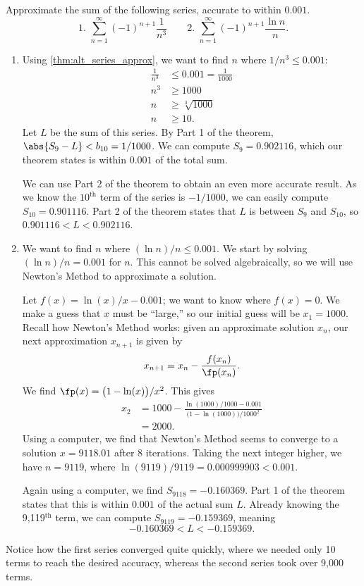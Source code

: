 \begin{example}\label{ex_alt_series_approx}%
Approximate the sum of the following series, accurate to within $0.001$.
\[
 \text{1. }\sum_{n=1}^\infty (-1)^{n+1}\frac{1}{n^3}\qquad
 \text{2. }\sum_{n=1}^\infty (-1)^{n+1}\frac{\ln n}{n}.
\]
\solution
\begin{enumerate}
	\item  Using \autoref{thm:alt_series_approx}, we want to find $n$ where $1/n^3 \le 0.001$:
	\begin{align*}
	\frac1{n^3} &\leq 0.001=\frac{1}{1000} \\
	n^3 &\geq 1000\\
	n &\geq \sqrt[3]{1000}\\
	n &\geq 10.
	\end{align*}
	Let $L$ be the sum of this series. By Part 1 of the theorem, $\abs{S_9-L}<b_{10} = 1/1000$. We can compute $S_9=0.902116$, which our theorem states is within $0.001$ of the total sum. 
	
	We can use Part 2 of the theorem to obtain an even more accurate result. As we know the $10^\text{th}$ term of the series is $-1/1000$, we can easily compute $S_{10} = 0.901116$. Part 2 of the theorem states that $L$ is between $S_9$ and $S_{10}$, so $0.901116 <L<0.902116$.
	
	\item		We want to find $n$ where $(\ln n)/n \le 0.001$. We start by solving $(\ln n)/n = 0.001$ for $n$. This cannot be solved algebraically, so we will use Newton's Method to approximate a solution. 
	
	Let $f(x) = \ln(x)/x-0.001$; we want to know where $f(x) = 0$. We make a guess that $x$ must be ``large,'' so our initial guess will be $x_1=1000$. Recall how Newton's Method works: given an approximate solution $x_n$, our next approximation $x_{n+1}$ is given by
	\[x_{n+1} = x_n - \frac{f(x_n)}{\fp(x_n)}.\]
	We find $\fp(x) = \bigl(1-\ln(x)\bigr)/x^2$. This gives
	\begin{align*}
	x_2 &= 1000 - \frac{\ln(1000)/1000-0.001}{\bigl(1-\ln(1000)\bigr)/1000^2} \\
			&= 2000.
	\end{align*}
	Using a computer, we find that Newton's Method seems to converge to a solution $x=9118.01$ after 8 iterations. Taking the next integer higher, we have $n=9119$, where $\ln(9119)/9119 =0.000999903<0.001$.
	
	Again using a computer, we find $S_{9118} = -0.160369$. Part 1 of the theorem states that this is within $0.001$ of the actual sum $L$. Already knowing the 9,119$^\text{th}$ term, we can compute $S_{9119} = -0.159369$, meaning
	\[-0.160369 < L < -0.159369.\]
	
\end{enumerate}
Notice how the first series converged quite quickly, where we needed only 10 terms to reach the desired accuracy, whereas the second series took over 9,000 terms.
\end{example}

